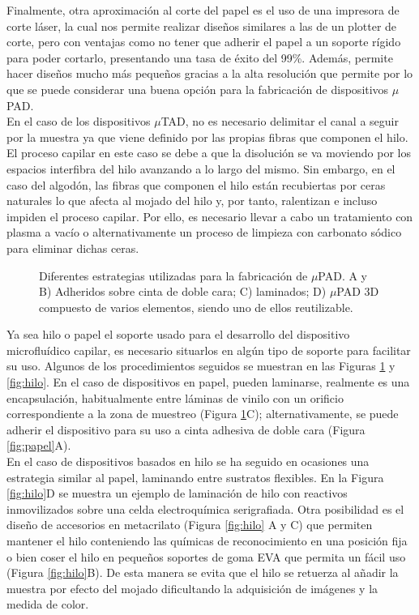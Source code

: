 \documentclass{article}
\begin{document}
Finalmente, otra aproximación al corte del papel es el uso de una impresora de corte láser, la cual nos permite realizar diseños similares a las de un plotter de corte, pero con ventajas como no tener que adherir el papel a un soporte rígido para poder cortarlo, presentando una tasa de éxito del 99\%. Además, permite hacer diseños mucho más pequeños gracias a la alta resolución que permite por lo que se puede considerar una buena opción para la fabricación de dispositivos $\mu$PAD. \\

En el caso de los dispositivos $\mu$TAD, no es necesario delimitar el canal a seguir por la muestra ya que viene definido por las propias fibras que componen el hilo. El proceso capilar en este caso se debe a que la disolución se va moviendo por los espacios interfibra del hilo avanzando a lo largo del mismo. Sin embargo, en el caso del algodón, las fibras que componen el hilo están recubiertas por ceras naturales lo que afecta al mojado del hilo y, por tanto, ralentizan e incluso impiden el proceso capilar. Por ello, es necesario llevar a cabo un tratamiento con plasma a vacío o alternativamente un proceso de limpieza con carbonato sódico para eliminar dichas ceras\cite{Nilghaz2013}.\\

\begin{figure}[h]
\caption{Diferentes estrategias utilizadas para la fabricación de $\mu$PAD. A y B) Adheridos sobre cinta de doble cara; C) laminados; D) $\mu$PAD 3D compuesto de varios elementos, siendo uno de ellos reutilizable. }
\label{fig:moneda}
\end{figure}

Ya sea hilo o papel el soporte usado para el desarrollo del dispositivo microfluídico capilar, es necesario situarlos en algún tipo de soporte para facilitar su uso. Algunos de los procedimientos seguidos se muestran en las Figuras \ref{fig:moneda} y \ref{fig:hilo}. En el caso de dispositivos en papel, pueden laminarse, realmente es una encapsulación, habitualmente entre láminas de vinilo con un orificio correspondiente a la zona de muestreo (Figura \ref{fig:moneda}C); alternativamente, se puede adherir el dispositivo para su uso a cinta adhesiva de doble cara (Figura \ref{fig:papel}A). \\

En el caso de dispositivos basados en hilo se ha seguido en ocasiones una estrategia similar al papel, laminando entre sustratos flexibles. En la Figura \ref{fig:hilo}D se muestra un ejemplo de laminación de hilo con reactivos inmovilizados sobre una celda electroquímica serigrafiada. Otra posibilidad es el diseño de accesorios en metacrilato (Figura \ref{fig:hilo} A y C) que permiten mantener el hilo conteniendo las químicas de reconocimiento en una posición fija o bien coser el hilo en pequeños soportes de goma EVA que permita un fácil uso (Figura \ref{fig:hilo}B). De esta manera se evita que el hilo se retuerza al añadir la muestra por efecto del mojado dificultando la adquisición de imágenes y la medida de color.\\
\end{document}
